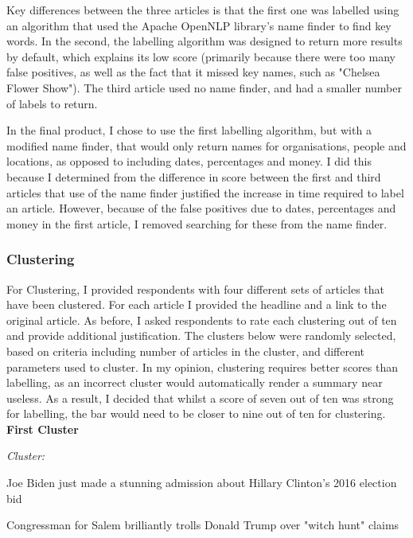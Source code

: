 \documentclass[12pt]{article}
\begin{document}
Key differences between the three articles is that the first one was labelled using an algorithm that used the Apache OpenNLP \cite{opennlp} library's name finder to find key words. In the second, the labelling algorithm was designed to return more results by default, which explains its low score (primarily because there were too many false positives, as well as the fact that it missed key names, such as "Chelsea Flower Show"). The third article used no name finder, and had a smaller number of labels to return.

In the final product, I chose to use the first labelling algorithm, but with a modified name finder, that would only return names for organisations, people and locations, as opposed to including dates, percentages and money. I did this because I determined from the difference in score between the first and third articles that use of the name finder justified the increase in time required to label an article. However, because of the false positives due to dates, percentages and money in the first article, I removed searching for these from the name finder. 

\subsubsection{Clustering}

For Clustering, I provided respondents with four different sets of articles that have been clustered. For each article I provided the headline and a link to the original article. As before, I asked respondents to rate each clustering out of ten and provide additional justification. The clusters below were randomly selected, based on criteria including number of articles in the cluster, and different parameters used to cluster. In my opinion, clustering requires better scores than labelling, as an incorrect cluster would automatically render a summary near useless. As a result, I decided that whilst a score of seven out of ten was strong for labelling, the bar would need to be closer to nine out of ten for clustering.\\

\textbf{First Cluster}

\begin{mdframed}

\emph{Cluster:}

Joe Biden just made a stunning admission about Hillary Clinton's 2016 election bid \cite{bidenarticle}

Congressman for Salem brilliantly trolls Donald Trump over "witch hunt" claims \cite{trumpsalem} \\

\end{mdframed}
\end{document}
